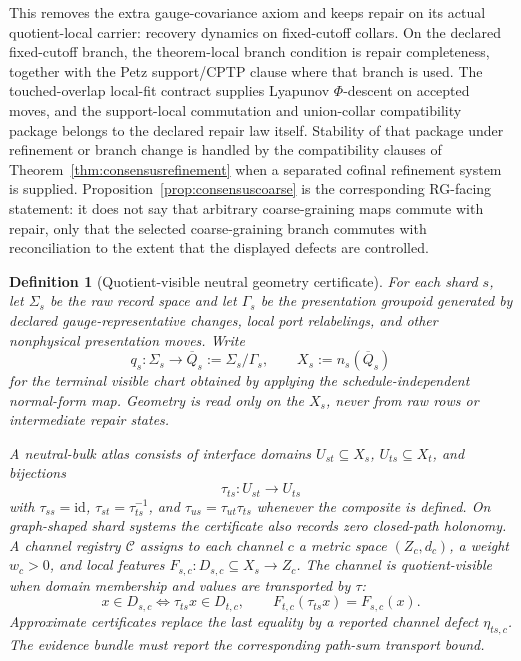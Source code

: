 \documentclass[11pt]{article}
\newtheorem{definition}[theorem]{Definition}
\begin{document}
This removes the extra gauge-covariance axiom and keeps repair on its actual quotient-local
carrier: recovery dynamics on fixed-cutoff collars. On the declared fixed-cutoff branch, the
theorem-local branch condition is repair completeness, together with the Petz support/CPTP clause
where that branch is used. The touched-overlap local-fit contract supplies Lyapunov
\(\Phi\)-descent on accepted moves, and the support-local commutation and union-collar
compatibility package belongs to the declared repair law itself. Stability of that package under
refinement or branch change is handled by the compatibility clauses of
Theorem~\ref{thm:consensusrefinement} when a separated cofinal refinement system is supplied.
Proposition~\ref{prop:consensuscoarse} is the corresponding RG-facing statement: it does not say
that arbitrary coarse-graining maps commute with repair, only that the selected coarse-graining
branch commutes with reconciliation to the extent that the displayed defects are controlled.

\begin{definition}[Quotient-visible neutral geometry certificate]\label{def:neutral-quotient-geometry-certificate}
For each shard \(s\), let \(\Sigma_s\) be the raw record space and let \(\Gamma_s\) be the
presentation groupoid generated by declared gauge-representative changes, local port relabelings,
and other nonphysical presentation moves. Write
\[
q_s:\Sigma_s\to \overline Q_s:=\Sigma_s/\Gamma_s,
\qquad
X_s:=n_s(\overline Q_s)
\]
for the terminal visible chart obtained by applying the schedule-independent normal-form map.
Geometry is read only on the \(X_s\), never from raw rows or intermediate repair states.

A neutral-bulk atlas consists of interface domains \(U_{st}\subseteq X_s\), \(U_{ts}\subseteq
X_t\), and bijections
\[
\tau_{ts}:U_{st}\to U_{ts}
\]
with \(\tau_{ss}=\mathrm{id}\), \(\tau_{st}=\tau_{ts}^{-1}\), and
\(\tau_{us}=\tau_{ut}\tau_{ts}\) whenever the composite is defined. On graph-shaped shard
systems the certificate also records zero closed-path holonomy. A channel registry
\(\mathcal C\) assigns to each channel \(c\) a metric space \((Z_c,d_c)\), a weight \(w_c>0\),
and local features \(F_{s,c}:D_{s,c}\subseteq X_s\to Z_c\). The channel is quotient-visible when
domain membership and values are transported by \(\tau\):
\[
x\in D_{s,c}\Longleftrightarrow \tau_{ts}x\in D_{t,c},
\qquad
F_{t,c}(\tau_{ts}x)=F_{s,c}(x).
\]
Approximate certificates replace the last equality by a reported channel defect
\(\eta_{ts,c}\). The evidence bundle must report the corresponding path-sum transport bound.
\end{definition}
\end{document}
